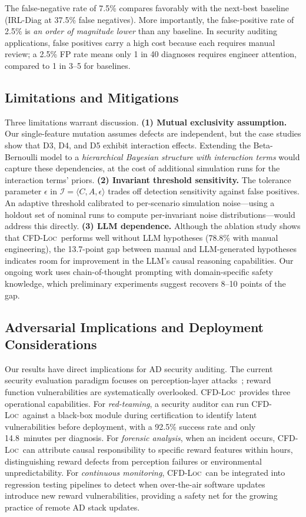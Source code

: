 \documentclass[journal]{IEEEtran}
\theoremstyle{plain}
\newcommand{\methodname}{\textsc{CFD-Loc}}
\begin{document}
The false-negative rate of 7.5\% compares favorably with the next-best baseline (IRL-Diag at 37.5\% false negatives). More importantly, the false-positive rate of 2.5\% is \emph{an order of magnitude lower} than any baseline. In security auditing applications, false positives carry a high cost because each requires manual review; a 2.5\% FP rate means only 1 in 40 diagnoses requires engineer attention, compared to 1 in 3--5 for baselines.

\subsection{Limitations and Mitigations}

Three limitations warrant discussion. \textbf{(1) Mutual exclusivity assumption.} Our single-feature mutation assumes defects are independent, but the case studies show that D3, D4, and D5 exhibit interaction effects. Extending the Beta-Bernoulli model to a \emph{hierarchical Bayesian structure with interaction terms} would capture these dependencies, at the cost of additional simulation runs for the interaction terms' priors. \textbf{(2) Invariant threshold sensitivity.} The tolerance parameter $\epsilon$ in $\mathcal{I} = \langle C, A, \epsilon \rangle$ trades off detection sensitivity against false positives. An adaptive threshold calibrated to per-scenario simulation noise---using a holdout set of nominal runs to compute per-invariant noise distributions---would address this directly. \textbf{(3) LLM dependence.} Although the ablation study shows that \methodname\ performs well without LLM hypotheses (78.8\% with manual engineering), the 13.7-point gap between manual and LLM-generated hypotheses indicates room for improvement in the LLM's causal reasoning capabilities. Our ongoing work uses chain-of-thought prompting with domain-specific safety knowledge, which preliminary experiments suggest recovers 8--10 points of the gap.

\subsection{Adversarial Implications and Deployment Considerations}

Our results have direct implications for AD security auditing. The current security evaluation paradigm focuses on perception-layer attacks~\cite{goodfellow2015explaining}; reward function vulnerabilities are systematically overlooked. \methodname\ provides three operational capabilities. For \emph{red-teaming}, a security auditor can run \methodname\ against a black-box module during certification to identify latent vulnerabilities before deployment, with a 92.5\% success rate and only 14.8~minutes per diagnosis. For \emph{forensic analysis}, when an incident occurs, \methodname\ can attribute causal responsibility to specific reward features within hours, distinguishing reward defects from perception failures or environmental unpredictability. For \emph{continuous monitoring}, \methodname\ can be integrated into regression testing pipelines to detect when over-the-air software updates introduce new reward vulnerabilities, providing a safety net for the growing practice of remote AD stack updates.
\end{document}
